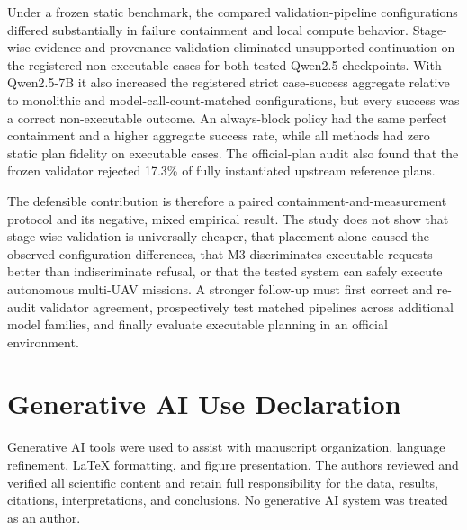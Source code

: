 \documentclass[conference]{IEEEtran}
\newcommand{\Mthree}{\textsc{M3}\xspace}
\begin{document}
Under a frozen static benchmark, the compared validation-pipeline
configurations differed substantially in failure containment and local compute
behavior. Stage-wise evidence and provenance validation eliminated unsupported
continuation on the registered non-executable cases for both tested Qwen2.5
checkpoints. With Qwen2.5-7B it also increased the registered strict case-success
aggregate relative to monolithic and model-call-count-matched configurations,
but every success was a correct non-executable outcome. An always-block policy
had the same perfect containment and a higher aggregate success rate, while all
methods had zero static plan fidelity on executable cases. The official-plan
audit also found that the frozen validator rejected 17.3\% of fully
instantiated upstream reference plans.

The defensible contribution is therefore a paired containment-and-measurement
protocol and its negative, mixed empirical result. The study does not show that
stage-wise validation is universally cheaper, that placement alone caused the
 observed configuration differences, that \Mthree discriminates executable requests better
than indiscriminate refusal, or that the tested system can safely execute
autonomous multi-UAV missions. A stronger follow-up must first correct and
 re-audit validator agreement, prospectively test matched pipelines across
 additional model families, and finally evaluate executable planning in an
 official environment.

\section*{Generative AI Use Declaration}

Generative AI tools were used to assist with manuscript organization, language
refinement, \LaTeX{} formatting, and figure presentation. The authors reviewed
and verified all scientific content and retain full responsibility for the
data, results, citations, interpretations, and conclusions. No generative AI
system was treated as an author.
\end{document}
